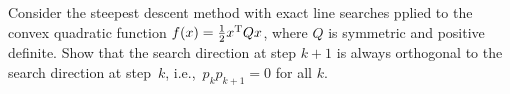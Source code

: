 \begin{problem}
  Consider the steepest descent method with exact line searches pplied to the convex quadratic function $f(x)=\frac{1}{2}x^{\textrm{T}} Q x$, where $Q$ is symmetric and positive definite.  Show that the search direction at step $k+1$ is always orthogonal to the search direction at step~$k$, i.e.,~$p_{k}p_{k+1} = 0$ for all $k$.
\end{problem}

